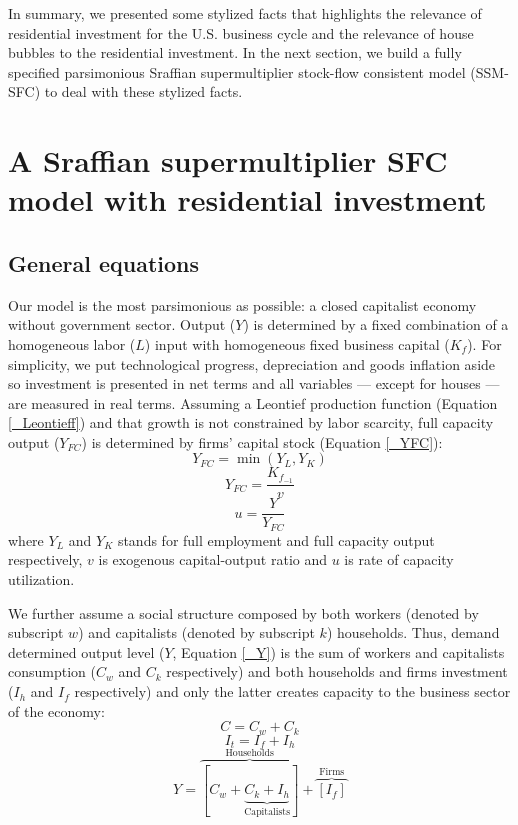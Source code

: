 \documentclass[12pt]{article}
\begin{document}
In summary, we presented some stylized facts that highlights the relevance of residential investment for the U.S. business cycle and the relevance of house bubbles to the residential investment.
In the next section, we build a fully specified parsimonious Sraffian supermultiplier stock-flow consistent model (SSM-SFC) to deal with these stylized facts.


\section{A Sraffian supermultiplier SFC model with residential investment}
\label{sec:orge9d29f5}
\label{sec:Model}
\subsection{General equations}
\label{sec:orgeea8f5a}

Our model is the most parsimonious as possible: a closed capitalist economy without government sector. Output (\(Y\)) is determined by  a fixed combination of a homogeneous labor (\(L\)) input with homogeneous fixed business capital (\(K_f\)). 
For simplicity, we put technological progress, depreciation and goods inflation aside so investment is presented in net terms and all variables --- except for houses --- are measured in real terms.
Assuming a Leontief production function (Equation \ref{_Leontieff}) and that growth is not constrained by labor scarcity, full capacity output (\(Y_{FC}\)) is
determined by firms' capital stock (Equation \ref{_YFC}):
\begin{equation}
\label{_Leontieff}
    Y_{FC} = \min (Y_L, Y_K)
\end{equation}
\begin{equation}
\label{_YFC}
    Y_{FC} = \frac{K_{f_{-1}}}{v}
\end{equation}
\begin{equation}
\label{_u}
    u = \frac{Y}{Y_{FC}}
\end{equation}
where \(Y_L\) and \(Y_K\) stands for full employment and full capacity output respectively, \(v\) is exogenous capital-output ratio and \(u\) is rate of capacity utilization.

We further assume a social structure composed by both workers (denoted by subscript \(w\)) and capitalists (denoted by subscript \(k\)) households.
Thus, demand determined output level (\(Y\), Equation \ref{_Y})  is the sum of workers and capitalists consumption (\(C_w\) and \(C_k\) respectively) and both households and firms investment (\(I_h\) and \(I_f\) respectively) and only the latter creates capacity to the business sector of the economy:
\begin{equation}
\label{_Ct}
    C = C_w + C_k
\end{equation}
\begin{equation}
\label{_It}
    I_t = I_f + I_h
\end{equation}
\begin{equation}
\label{_Y}
    Y = \overbrace{[C_w + \underbrace{C_k + I_h}_{\text{Capitalists}}]}^{\text{Households}} + \overbrace{[I_f]}^{\text{Firms}}
\end{equation}
\end{document}
